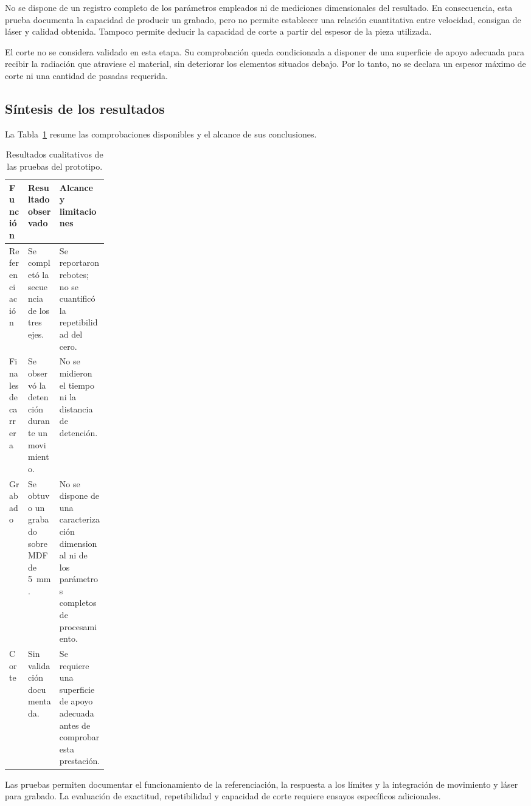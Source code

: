 \documentclass[blue,fullpaper]{ludusofficial}  %
\begin{document}
No se dispone de un registro completo de los
parámetros empleados ni de mediciones dimensionales
del resultado. En consecuencia, esta prueba
documenta la capacidad de producir un grabado,
pero no permite establecer una relación cuantitativa
entre velocidad, consigna de láser y calidad obtenida.
Tampoco permite deducir la capacidad de corte
a partir del espesor de la pieza utilizada.

El corte no se considera validado en esta etapa.
Su comprobación queda condicionada a disponer
de una superficie de apoyo adecuada para recibir
la radiación que atraviese el material,
sin deteriorar los elementos situados debajo.
Por lo tanto, no se declara un espesor máximo
de corte ni una cantidad de pasadas requerida.

\subsection{Síntesis de los resultados}

La Tabla~\ref{tab:resultados-observados} resume
las comprobaciones disponibles y el alcance
de sus conclusiones.

\begin{table}[htbp]
\centering
\small
\caption{Resultados cualitativos de las pruebas del prototipo.}
\label{tab:resultados-observados}
\begin{tabularx}{\linewidth}{p{0.19\linewidth}XX}
\hline
\textbf{Función} & \textbf{Resultado observado} &
\textbf{Alcance y limitaciones} \\
\hline
Referenciación &
Se completó la secuencia de los tres ejes. &
Se reportaron rebotes; no se cuantificó
la repetibilidad del cero. \\
Finales de carrera &
Se observó la detención durante un movimiento. &
No se midieron el tiempo ni la distancia
de detención. \\
Grabado &
Se obtuvo un grabado sobre MDF de 5~mm. &
No se dispone de una caracterización
dimensional ni de los parámetros completos
de procesamiento. \\
Corte &
Sin validación documentada. &
Se requiere una superficie de apoyo adecuada
antes de comprobar esta prestación. \\
\hline
\end{tabularx}
\end{table}

Las pruebas permiten documentar el funcionamiento
de la referenciación, la respuesta a los límites
y la integración de movimiento y láser para grabado.
La evaluación de exactitud, repetibilidad y capacidad
de corte requiere ensayos específicos adicionales.
\end{document}
